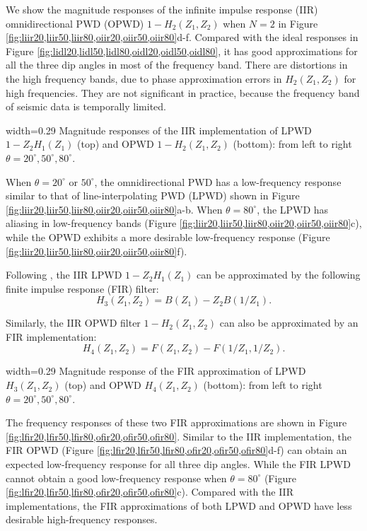 
We show the magnitude responses of the 
infinite impulse response (IIR)
omnidirectional PWD (OPWD)
$1-H_2(Z_1,Z_2)$ when $N=2$ in 
Figure \ref{fig:liir20,liir50,liir80,oiir20,oiir50,oiir80}d-f.
Compared with the ideal responses in 
Figure \ref{fig:lidl20,lidl50,lidl80,oidl20,oidl50,oidl80},
it has good approximations for all the three dip angles 
in most of the frequency band.
There are distortions in the high frequency bands,
due to 
phase approximation errors in $H_2(Z_1,Z_2)$ for high frequencies.
They are not significant in practice, 
because the frequency band of seismic data is temporally limited.

{width=0.29\textwidth}{
Magnitude responses of the IIR implementation of
LPWD $1-Z_2H_1(Z_1)$ (top) and
OPWD $1-H_2(Z_1,Z_2)$ (bottom): 
from left to right $\theta=20^\circ,50^\circ,80^\circ$.
}


When $\theta=20^\circ$ or $50^\circ$,
the omnidirectional PWD has a low-frequency response similar to that
of line-interpolating PWD (LPWD)
shown in Figure \ref{fig:liir20,liir50,liir80,oiir20,oiir50,oiir80}a-b.
When $\theta=80^\circ$, the LPWD has 
aliasing in low-frequency bands
(Figure \ref{fig:liir20,liir50,liir80,oiir20,oiir50,oiir80}c),
while the OPWD exhibits a more desirable low-frequency response
(Figure \ref{fig:liir20,liir50,liir80,oiir20,oiir50,oiir80}f).

Following \cite{fomel:1946},
the IIR LPWD $1-Z_2H_1(Z_1)$ can be approximated by the following 
finite impulse response (FIR) filter:
\begin{equation}
H_3(Z_1,Z_2)=B(Z_1)-Z_2B(1/Z_1).
\end{equation}

Similarly, the IIR OPWD filter $1-H_2(Z_1,Z_2)$
can also be approximated by an FIR implementation:
\begin{equation}\label{eq:pwd:h4}
H_4(Z_1,Z_2)=F(Z_1,Z_2)-F(1/Z_1,1/Z_2).
\end{equation}

{width=0.29\textwidth}{
Magnitude response of the FIR approximation of
LPWD $H_3(Z_1,Z_2)$ (top) and
OPWD $H_4(Z_1,Z_2)$ (bottom):
from left to right $\theta=20^\circ,50^\circ,80^\circ$.
}

The frequency responses of these two FIR approximations
are shown in Figure \ref{fig:lfir20,lfir50,lfir80,ofir20,ofir50,ofir80}.
Similar to the IIR implementation, 
the FIR OPWD (Figure \ref{fig:lfir20,lfir50,lfir80,ofir20,ofir50,ofir80}d-f)
can obtain an expected low-frequency response
for all three dip angles.
While the FIR LPWD cannot obtain a good low-frequency response 
when $\theta=80^\circ$
(Figure \ref{fig:lfir20,lfir50,lfir80,ofir20,ofir50,ofir80}c). 
Compared with the IIR implementations, 
the FIR approximations of both LPWD and OPWD have 
less desirable high-frequency responses.

